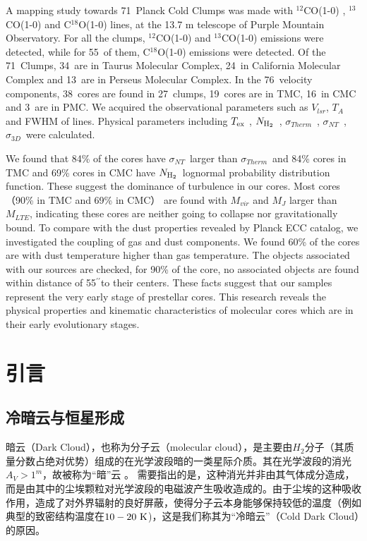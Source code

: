 \documentclass[UTF8, nocolorlinks]{pkuthss}
\newcommand{\coaa}{$^{12}$CO(1-0) }
\newcommand{\cobb}{$^{13}$CO(1-0) }
\newcommand{\cocc}{C$^{18}$O(1-0) }
\newcommand{\texc}{$T_{\rm {ex}}$ }
\newcommand{\nhyd}{$N_{\rm H_2}$\ }
\newcommand{\sigmath}{$\sigma _{Therm}$\ }
\newcommand{\sigmant}{$\sigma _{NT}$\ }
\newcommand{\sigmatd}{$\sigma _{3D}$\ }
\newcommand{\arcsec}{$^{\prime\prime}$}
\newcommand{\numsou}{71\ }
\newcommand{\numsoutmc}{34\ }
\newcommand{\numsoupmc}{13\ }
\newcommand{\numsoucmc}{24\ }
\newcommand{\numcore}{38\ }
\newcommand{\numcoretmc}{19\ }
\newcommand{\numcorepmc}{3\ }
\newcommand{\numcorecmc}{16\ }
\newcommand{\numcocc}{55\ }
\newcommand{\numcompofcores}{27\ }
\newcommand{\numvelcomp}{76\ }
\begin{document}
\begin{eabstract}

	A mapping study towards \numsou Planck Cold Clumps was made with \coaa, \cobb and \cocc lines, at the 13.7 m telescope of Purple Mountain Observatory. For all the clumps, \coaa and \cobb emissions were detected, while for \numcocc of them, \cocc emissions were detected.  Of the \numsou Clumps, \numsoutmc are in Taurus Molecular Complex, \numsoucmc in California  Molecular Complex and \numsoupmc are in Perseus Molecular Complex. In the \numvelcomp velocity components, \numcore cores are found in \numcompofcores clumps, \numcoretmc cores are in TMC, \numcorecmc in CMC and \numcorepmc are in PMC.
    We acquired the observational parameters such as $V_{lsr}$, $T_{A}$ and FWHM of lines. Physical parameters including \texc, \nhyd, \sigmath, \sigmant,  \sigmatd were calculated.

    We found that 84\% of the cores have \sigmant larger than \sigmath and 84\% cores in TMC and 69\% cores in CMC have \nhyd lognormal probability distribution function. These suggest the dominance of turbulence in our cores. Most cores （90\% in TMC and 69\% in CMC） are found with $M_{vir}$ and $M_J$ larger than $M_{LTE}$, indicating these cores are neither going to collapse nor gravitationally bound. To compare with the dust properties revealed by Planck ECC catalog, we investigated the coupling of gas and dust components. We found 60\% of the cores are with dust temperature higher than gas temperature. The objects associated with our sources are checked, for 90\% of the core, no associated objects are found within distance of 55\arcsec to their centers. These facts suggest that our samples represent the very early stage of prestellar cores. This research reveals the physical properties and kinematic characteristics of molecular cores which are in their early evolutionary stages.
\end{eabstract}

	\tableofcontents
	\mainmatter
\chapter{引言}
	\section{冷暗云与恒星形成}\label{Sec.ColdDarkCloud}

		暗云（Dark Cloud），也称为分子云（molecular cloud），是主要由$H_2$分子（其质量分数占绝对优势）组成的在光学波段暗的一类星际介质。其在光学波段的消光$A_V>1^{m}$，故被称为“暗”云\supercite{2007ARA&A..45..339B} 。 需要指出的是，这种消光并非由其气体成分造成，而是由其中的尘埃颗粒对光学波段的电磁波产生吸收造成的。由于尘埃的这种吸收作用，造成了对外界辐射的良好屏蔽，使得分子云本身能够保持较低的温度（例如典型的致密结构温度在$10-20\rm\ K$\supercite{1983ApJ...265..223B})，这是我们称其为“冷暗云”（Cold Dark Cloud）的原因。
\end{document}
